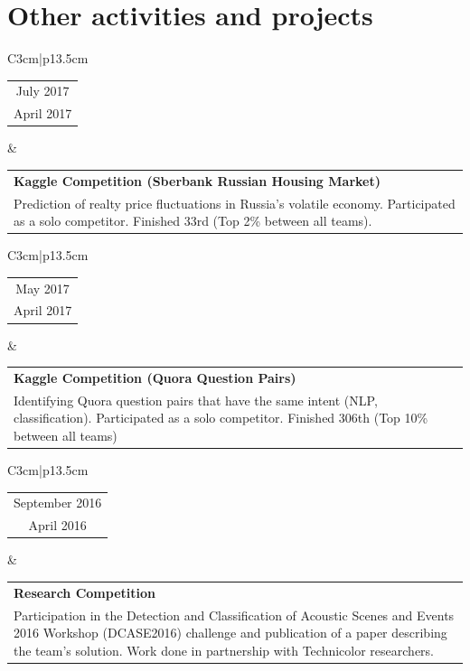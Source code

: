 \section{Other activities and projects}

\begin{tabular}{C{3cm}|p{13.5cm}}
    \begin{tabular}{c}
        July 2017
        \\
        April 2017
    \end{tabular}
    &
    \setlength\extrarowheight{3pt}
    \begin{tabular}{p{13.5cm}}
        \textbf{Kaggle Competition (Sberbank Russian Housing Market)}
        \\
        Prediction of realty price fluctuations in Russia’s volatile economy. Participated as a solo competitor. Finished 33rd (Top 2\% between all teams).
    \end{tabular}
\end{tabular}


\begin{tabular}{C{3cm}|p{13.5cm}}
    \begin{tabular}{c}
        May 2017
        \\
        April 2017
    \end{tabular}
    &
    \setlength\extrarowheight{3pt}
    \begin{tabular}{p{13.5cm}}
        \textbf{Kaggle Competition (Quora Question Pairs)}
        \\
        Identifying Quora question pairs that have the same intent (NLP, classification). Participated as a solo competitor. Finished 306th (Top 10\% between all teams)
    \end{tabular}
\end{tabular}


\begin{tabular}{C{3cm}|p{13.5cm}}
    \begin{tabular}{c}
        September 2016
        \\
        April 2016
    \end{tabular}
    &
    \setlength\extrarowheight{3pt}
    \begin{tabular}{p{13.5cm}}
        \textbf{Research Competition}
        \\
        Participation in the Detection and Classification of Acoustic Scenes and Events 2016 Workshop (DCASE2016) challenge and publication of a paper describing the team's solution. Work done in partnership with Technicolor researchers.
    \end{tabular}
\end{tabular}


